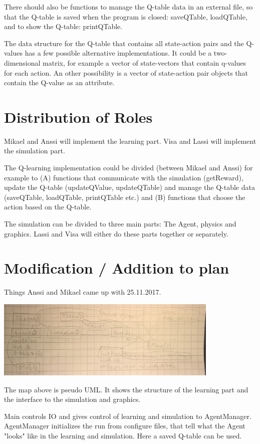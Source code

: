 \documentclass{article}
\begin{document}
There should also be functions to manage the Q-table data in an external file,
so that the Q-table is saved when the program is closed: saveQTable, loadQTable,
and to show the Q-table: printQTable.

The data structure for the Q-table that contains all state-action pairs
and the Q-values has a few possible alternative
implementations. It could be a two-dimensional matrix, for example a
vector of state-vectors that contain q-values for each action. An other
possibility is a vector
of state-action pair objects that contain the Q-value as an attribute.



\section{Distribution of Roles}
Mikael and Anssi will implement the learning part. Visa and Lassi will
implement the simulation part.

The Q-learning implementation could be divided (between Mikael and Anssi) for
example to (A) functions that communicate with the simulation (getReward), update
the Q-table (updateQValue, updateQTable) and manage the Q-table data (saveQTable,
loadQTable, printQTable etc.) and (B) functions that choose the action based on
the Q-table.

The simulation can be divided to three main parts: The Agent, physics and graphics.
Lassi and Visa will either do these parts together or separately.



\section{Modification / Addition to plan}
Things Anssi and Mikael came up with 25.11.2017.

\includegraphics[width=0.8\textwidth]{improved_pseudo_UML}

The map above is pseudo UML. It shows the structure of the learning part
and the interface to the simulation and graphics.

Main controls IO and gives control of learning and simulation to AgentManager.
AgentManager initializes the run from configure files, that tell what the
Agent "looks" like in the learning and simulation. Here a saved Q-table can
be used.
\end{document}
